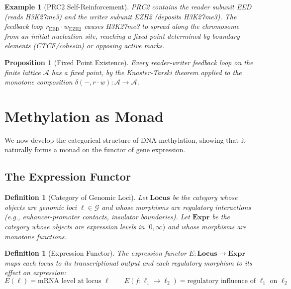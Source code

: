 \documentclass[12pt,a4paper]{article}
\newtheorem{proposition}[theorem]{Proposition}
\newtheorem{definition}[theorem]{Definition}
\newtheorem{example}[theorem]{Example}
\newcommand{\eg}{\textit{e.g.}}
\newcommand{\cat}[1]{\mathbf{#1}}
\begin{document}
\begin{example}[PRC2 Self-Reinforcement]
PRC2 contains the reader subunit EED (reads H3K27me3) and the writer subunit EZH2 (deposits H3K27me3). The feedback loop $r_{\mathrm{EED}} \cdot w_{\mathrm{EZH2}}$ causes H3K27me3 to spread along the chromosome from an initial nucleation site, reaching a fixed point determined by boundary elements (CTCF/cohesin) or opposing active marks.
\end{example}

\begin{proposition}[Fixed Point Existence]
\label{prop:fixed-point}
Every reader-writer feedback loop on the finite lattice $\mathcal{A}$ has a fixed point, by the Knaster-Tarski theorem applied to the monotone composition $\delta(-, r \cdot w) : \mathcal{A} \to \mathcal{A}$.
\end{proposition}

\section{Methylation as Monad}
\label{sec:methylation-monad}

We now develop the categorical structure of DNA methylation, showing that it naturally forms a monad on the functor of gene expression.

\subsection{The Expression Functor}

\begin{definition}[Category of Genomic Loci]
\label{def:cat-gene}
Let $\cat{Locus}$ be the category whose objects are genomic loci $\ell \in \mathcal{G}$ and whose morphisms are regulatory interactions (\eg, enhancer-promoter contacts, insulator boundaries). Let $\cat{Expr}$ be the category whose objects are expression levels in $[0, \infty)$ and whose morphisms are monotone functions.
\end{definition}

\begin{definition}[Expression Functor]
\label{def:expr-functor}
The \emph{expression functor} $E : \cat{Locus} \to \cat{Expr}$ maps each locus to its transcriptional output and each regulatory morphism to its effect on expression:
\[
    E(\ell) = \text{mRNA level at locus } \ell \qquad E(f : \ell_1 \to \ell_2) = \text{regulatory influence of } \ell_1 \text{ on } \ell_2
\]
\end{definition}
\end{document}
